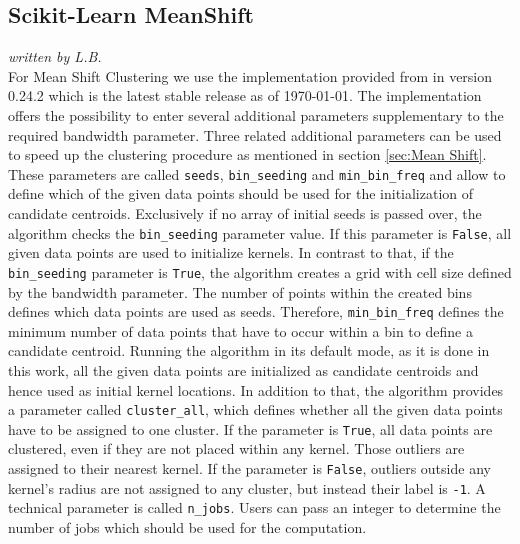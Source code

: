\subsection{Scikit-Learn MeanShift}
\label{subsec:sklearn_meanshift}
\textit{written by L.B.}\\

For Mean Shift Clustering we use the implementation provided from \cite{sklearn_api} in version 0.24.2 which is the latest stable release as of \today. 
The implementation offers the possibility to enter several additional parameters supplementary to the required bandwidth parameter. Three related additional parameters can be used to speed up the clustering procedure as mentioned in section \ref{sec:Mean Shift}. These parameters are called \texttt{seeds}, \texttt{bin_seeding} and \texttt{min_bin_freq} and allow to define which of the given data points should be used for the initialization of candidate centroids. Exclusively if no array of initial seeds is passed over, the algorithm checks the \texttt{bin_seeding} parameter value. If this parameter is \texttt{False}, all given data points are used to initialize kernels. In contrast to that, if the \texttt{bin_seeding} parameter is \texttt{True}, the algorithm creates a grid with cell size defined by the bandwidth parameter. The number of points within the created bins defines which data points are used as seeds. Therefore, \texttt{min_bin_freq} defines the minimum number of data points that have to occur within a bin to define a candidate centroid.
Running the algorithm in its default mode, as it is done in this work, all the given data points are initialized as candidate centroids and hence used as initial kernel locations. 
In addition to that, the algorithm provides a parameter called \texttt{cluster_all}, which defines whether all the given data points have to be assigned to one cluster. If the parameter is \texttt{True}, all data points are clustered, even if they are not placed within any kernel. Those outliers are assigned to their nearest kernel. If the parameter is \texttt{False}, outliers outside any kernel's radius are not assigned to any cluster, but instead their label is \texttt{-1}. 
A technical parameter is called \texttt{n_jobs}. Users can pass an integer to determine the number of jobs which should be used for the computation.\\
